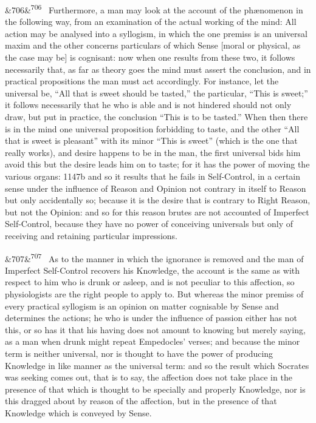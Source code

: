 \documentclass[12pt]{article}
\newcommand{\para}[1][]{\par\noindent\ifx&#1&\else\textsuperscript{\footnotesize #1}~\fi}
\begin{document}
\para[706] Furthermore, a man may look at the account of the phænomenon in the following way, from an examination of the actual working of the mind: All action may be analysed into a syllogism, in which the one premiss is an universal maxim and the other concerns particulars of which Sense [moral or physical, as the case may be] is cognisant: now when one results from these two, it follows necessarily that, as far as theory goes the mind must assert the conclusion, and in practical propositions the man must act accordingly. For instance, let the universal be, “All that is sweet should be tasted,” the particular, “This is sweet;” it follows necessarily that he who is able and is not hindered should not only draw, but put in practice, the conclusion “This is to be tasted.” When then there is in the mind one universal proposition forbidding to taste, and the other “All that is sweet is pleasant” with its minor “This is sweet” (which is the one that really works), and desire happens to be in the man, the first universal bids him avoid this but the desire leads him on to taste; for it has the power of moving the various organs: 1147b and so it results that he fails in Self-Control, in a certain sense under the influence of Reason and Opinion not contrary in itself to Reason but only accidentally so; because it is the desire that is contrary to Right Reason, but not the Opinion: and so for this reason brutes are not accounted of Imperfect Self-Control, because they have no power of conceiving universals but only of receiving and retaining particular impressions.

\para[707] As to the manner in which the ignorance is removed and the man of Imperfect Self-Control recovers his Knowledge, the account is the same as with respect to him who is drunk or asleep, and is not peculiar to this affection, so physiologists are the right people to apply to. But whereas the minor premiss of every practical syllogism is an opinion on matter cognisable by Sense and determines the actions; he who is under the influence of passion either has not this, or so has it that his having does not amount to knowing but merely saying, as a man when drunk might repeat Empedocles' verses; and because the minor term is neither universal, nor is thought to have the power of producing Knowledge in like manner as the universal term: and so the result which Socrates was seeking comes out, that is to say, the affection does not take place in the presence of that which is thought to be specially and properly Knowledge, nor is this dragged about by reason of the affection, but in the presence of that Knowledge which is conveyed by Sense.
\end{document}
